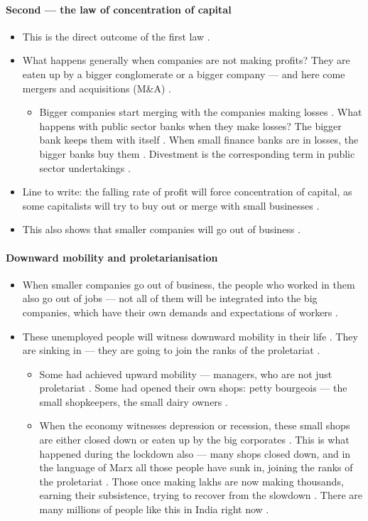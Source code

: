 \paragraph{Second --- the law of concentration of capital}
\begin{itemize}
    \item This is the direct outcome of the first law .
    \item What happens generally when companies are not making profits? They are eaten up by a bigger conglomerate or a bigger company --- and here come mergers and acquisitions (M\&A) .
    \begin{itemize}
        \item Bigger companies start merging with the companies making losses . What happens with public sector banks when they make losses? The bigger bank keeps them with itself . When small finance banks are in losses, the bigger banks buy them . Divestment is the corresponding term in public sector undertakings .
    \end{itemize}
    \item Line to write: the falling rate of profit will force concentration of capital, as some capitalists will try to buy out or merge with small businesses .
    \item This also shows that smaller companies will go out of business .
\end{itemize}

\paragraph{Downward mobility and proletarianisation}
\begin{itemize}
    \item When smaller companies go out of business, the people who worked in them also go out of jobs --- not all of them will be integrated into the big companies, which have their own demands and expectations of workers .
    \item These unemployed people will witness downward mobility in their life . They are sinking in --- they are going to join the ranks of the proletariat .
    \begin{itemize}
        \item Some had achieved upward mobility --- managers, who are not just proletariat . Some had opened their own shops: petty bourgeois --- the small shopkeepers, the small dairy owners .
        \item When the economy witnesses depression or recession, these small shops are either closed down or eaten up by the big corporates . This is what happened during the lockdown also --- many shops closed down, and in the language of Marx all those people have sunk in, joining the ranks of the proletariat . Those once making lakhs are now making thousands, earning their subsistence, trying to recover from the slowdown . There are many millions of people like this in India right now .
    \end{itemize}
\end{itemize}

